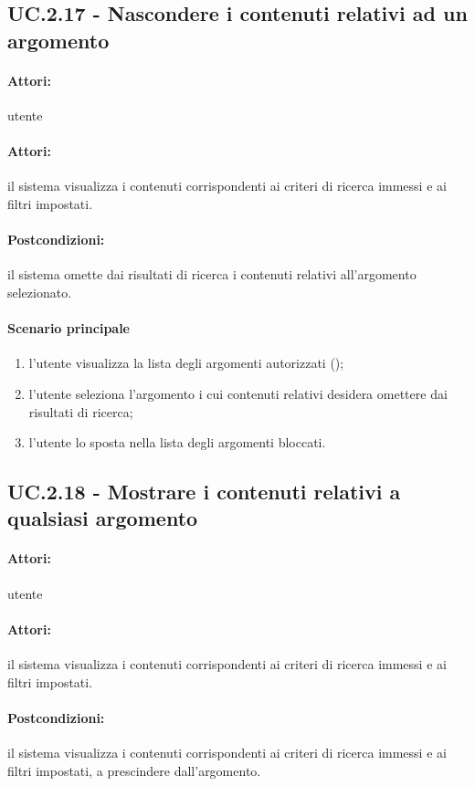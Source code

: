 \documentclass[10pt,a4paper,headinclude,footinclude,hidelinks]{scrreprt} %
\begin{document}
	\subsection[UC.2.17]{UC.2.17 - Nascondere i contenuti relativi ad un argomento}
	\label{sec:stage:ar:uc:2_17}
	\paragraph{Attori:} utente
	\paragraph{Attori:} il sistema visualizza i contenuti corrispondenti ai criteri di ricerca immessi e ai filtri impostati.
	\paragraph{Postcondizioni:} il sistema omette dai risultati di ricerca i contenuti relativi all'argomento selezionato.
	\paragraph{Scenario principale}
	\begin{enumerate}
	\item l'utente visualizza la lista degli argomenti autorizzati ();
	\item l'utente seleziona l'argomento i cui contenuti relativi desidera omettere dai risultati di ricerca;
	\item l'utente lo sposta nella lista degli argomenti bloccati.
	\end{enumerate}

	\subsection[UC.2.18]{UC.2.18 - Mostrare i contenuti relativi a qualsiasi argomento}
	\label{sec:stage:ar:uc:2_18}
	\paragraph{Attori:} utente
	\paragraph{Attori:} il sistema visualizza i contenuti corrispondenti ai criteri di ricerca immessi e ai filtri impostati.
	\paragraph{Postcondizioni:} il sistema visualizza i contenuti corrispondenti ai criteri di ricerca immessi e ai filtri impostati, a prescindere dall'argomento.
\end{document}

